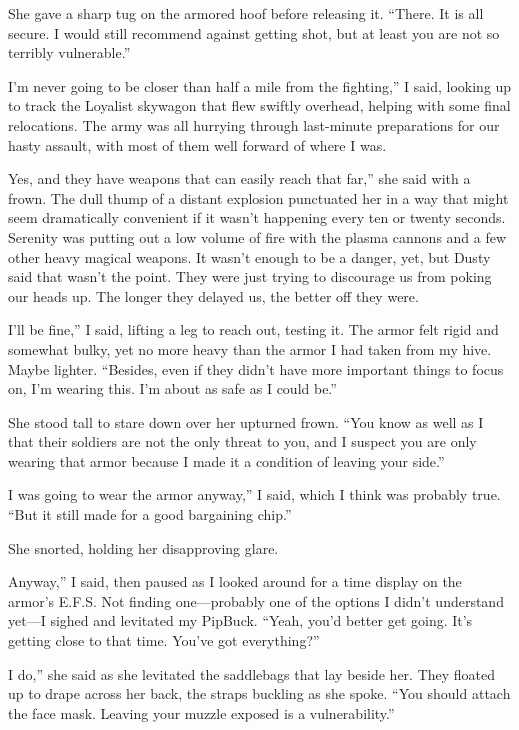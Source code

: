 She gave a sharp tug on the armored hoof before releasing it. “There. It is all secure. I would still recommend against getting shot, but at least you are not so terribly vulnerable.”

\leavevmode{}I’m never going to be closer than half a mile from the fighting,” I said, looking up to track the Loyalist skywagon that flew swiftly overhead, helping with some final relocations. The army was all hurrying through last-minute preparations for our hasty assault, with most of them well forward of where I was.

\leavevmode{}Yes, and they have weapons that can easily reach that far,” she said with a frown. The dull thump of a distant explosion punctuated her in a way that might seem dramatically convenient if it wasn’t happening every ten or twenty seconds. Serenity was putting out a low volume of fire with the plasma cannons and a few other heavy magical weapons. It wasn’t enough to be a danger, yet, but Dusty said that wasn’t the point. They were just trying to discourage us from poking our heads up. The longer they delayed us, the better off they were.

\leavevmode{}I’ll be fine,” I said, lifting a leg to reach out, testing it. The armor felt rigid and somewhat bulky, yet no more heavy than the armor I had taken from my hive. Maybe lighter. “Besides, even if they didn’t have more important things to focus on, I’m wearing this. I’m about as safe as I could be.”

She stood tall to stare down over her upturned frown. “You know as well as I that their soldiers are not the only threat to you, and I suspect you are only wearing that armor because I made it a condition of leaving your side.”

\leavevmode{}I was going to wear the armor anyway,” I said, which I think was probably true. “But it still made for a good bargaining chip.”

She snorted, holding her disapproving glare.

\leavevmode{}Anyway,” I said, then paused as I looked around for a time display on the armor’s E.F.S. Not finding one—probably one of the options I didn’t understand yet—I sighed and levitated my PipBuck. “Yeah, you’d better get going. It’s getting close to that time. You’ve got everything?”

\leavevmode{}I do,” she said as she levitated the saddlebags that lay beside her. They floated up to drape across her back, the straps buckling as she spoke. “You should attach the face mask. Leaving your muzzle exposed is a vulnerability.”


